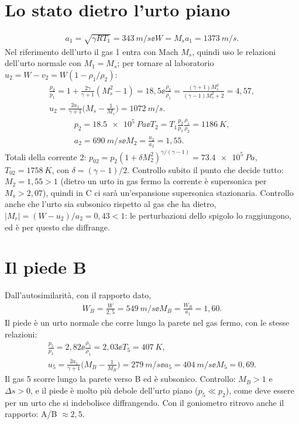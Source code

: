 \section*{Lo stato dietro l'urto piano}
\begin{gather*}
  a_1=\sqrt{\gamma R T_1}=\SI{343}{m/s} \ee W=M_s a_1=\SI{1373}{m/s}.
\end{gather*}
Nel riferimento dell'urto il gas 1 entra con Mach $M_s$, quindi uso le relazioni dell'urto normale con $M_1=M_s$; per
tornare al laboratorio $u_2=W-v_2=W(1-\rho_1/\rho_2)$:
\begin{gather*}
  \frac{p_2}{p_1}=1+\frac{2\gamma}{\gamma+1}(M_s^2-1)=18{,}5 \ee
  \frac{\rho_2}{\rho_1}=\frac{(\gamma+1)M_s^2}{(\gamma-1)M_s^2+2}=4{,}57,\\
  u_2=\frac{2a_1}{\gamma+1}\Big(M_s-\frac{1}{M_s}\Big)=\SI{1072}{m/s}.
\end{gather*}
\begin{gather*}
  p_2=\SI{18.5e5}{Pa} \ee T_2=T_1\frac{p_2}{p_1}\frac{\rho_1}{\rho_2}=\SI{1186}{K},\\
  a_2=\SI{690}{m/s} \ee M_2=\frac{u_2}{a_2}=1{,}55 .
\end{gather*}
Totali della corrente 2: $p_{02}=p_2(1+\delta M_2^2)^{\gamma/(\gamma-1)}=\SI{73.4e5}{Pa}$, $T_{02}=\SI{1758}{K}$, con
$\delta=(\gamma-1)/2$. Controllo subito il punto che decide tutto: $M_2=1{,}55>1$ (dietro un urto in gas fermo la
corrente è supersonica per $M_s>2{,}07$), quindi in C ci sarà un'espansione supersonica stazionaria. Controllo anche
che l'urto sia subsonico rispetto al gas che ha dietro, $|M_r|=(W-u_2)/a_2=0{,}43<1$: le perturbazioni dello spigolo lo
raggiungono, ed è per questo che diffrange.

\section*{Il piede B}
Dall'autosimilarità, con il rapporto dato,
\begin{gather*}
  W_B=\frac{W}{2{,}5}=\SI{549}{m/s} \ee M_B=\frac{W_B}{a_1}=1{,}60 .
\end{gather*}
Il piede è un urto normale che corre lungo la parete nel gas fermo, con le stesse relazioni:
\begin{gather*}
  \frac{p_5}{p_1}=2{,}82 \ee \frac{\rho_5}{\rho_1}=2{,}03 \ee T_5=\SI{407}{K},\\
  u_5=\frac{2a_1}{\gamma+1}\Big(M_B-\frac{1}{M_B}\Big)=\SI{279}{m/s} \ee a_5=\SI{404}{m/s} \ee M_5=0{,}69 .
\end{gather*}
Il gas 5 scorre lungo la parete verso B ed è subsonico. Controllo: $M_B>1$ e $\Delta s>0$, e il piede è molto più
debole dell'urto piano ($p_5\ll p_2$), come deve essere per un urto che si indebolisce diffrangendo. Con il goniometro
ritrovo anche il rapporto: A/B $\approx2{,}5$.

